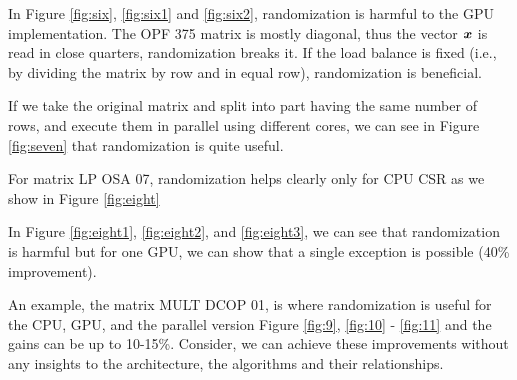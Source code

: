 \documentclass[manuscript,screen]{acmart}
\begin{document}
In Figure \ref{fig:six}, \ref{fig:six1} and \ref{fig:six2},
randomization is harmful to the GPU implementation. The OPF 375 matrix
is mostly diagonal, thus the vector ${\boldsymbol x}$ is read in close
quarters, randomization breaks it.  If the load balance is fixed
(i.e., by dividing the matrix by row and in equal row), randomization
is beneficial.


If we take the original matrix and split into part having the same
number of rows, and execute them in parallel using different cores, we
can see in Figure \ref{fig:seven} that randomization is quite useful.


For matrix LP OSA 07, randomization helps clearly only for CPU CSR as
we show in Figure \ref{fig:eight}


In Figure \ref{fig:eight1}, \ref{fig:eight2}, and \ref{fig:eight3}, we
can see that randomization is harmful but for one GPU, we can show
that a single exception is possible (40\% improvement).




An example, the matrix MULT DCOP 01, is where randomization is useful
for the CPU, GPU, and the parallel version Figure \ref{fig:9},
\ref{fig:10} - \ref{fig:11} and the gains can be up to
10-15\%. Consider, we can achieve these improvements without any
insights to the architecture, the algorithms and their relationships.
\end{document}
